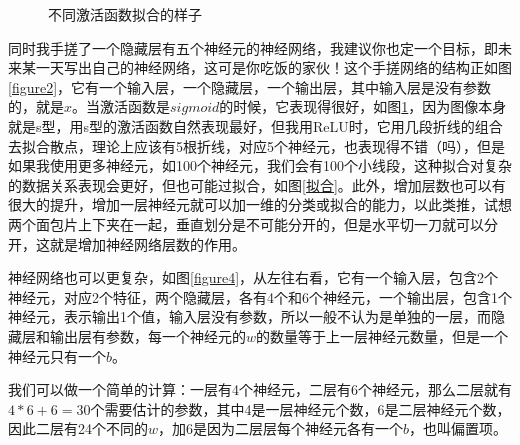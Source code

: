 \documentclass[a5paper, 11pt]{ctexbook}
\begin{document}
\begin{figure}[ht]
    \centering
    \caption{不同激活函数拟合的样子}
    \label{figure3}
\end{figure}

同时我手搓了一个隐藏层有五个神经元的神经网络，我建议你也定一个目标，即未来某一天写出自己的神经网络，这可是你吃饭的家伙！这个手搓网络的结构正如图\ref{figure2}，它有一个输入层，一个隐藏层，一个输出层，其中输入层是没有参数的，就是$x$。当激活函数是$sigmoid$的时候，它表现得很好，如图\ref{figure3}，因为图像本身就是s型，用s型的激活函数自然表现最好，但我用ReLU时，它用几段折线的组合去拟合散点，理论上应该有5根折线，对应5个神经元，也表现得不错（吗），但是如果我使用更多神经元，如100个神经元，我们会有100个小线段，这种拟合对复杂的数据关系表现会更好，但也可能过拟合，如图\ref{拟合}。此外，增加层数也可以有很大的提升，增加一层神经元就可以加一维的分类或拟合的能力，以此类推，试想两个面包片上下夹在一起，垂直划分是不可能分开的，但是水平切一刀就可以分开，这就是增加神经网络层数的作用。

神经网络也可以更复杂，如图\ref{figure4}，从左往右看，它有一个输入层，包含2个神经元，对应2个特征，两个隐藏层，各有4个和6个神经元，一个输出层，包含1个神经元，表示输出1个值，输入层没有参数，所以一般不认为是单独的一层，而隐藏层和输出层有参数，每一个神经元的$w$的数量等于上一层神经元数量，但是一个神经元只有一个$b$。

我们可以做一个简单的计算：一层有4个神经元，二层有6个神经元，那么二层就有$4*6+6=30$个需要估计的参数，其中4是一层神经元个数，6是二层神经元个数，因此二层有24个不同的$w$，加6是因为二层层每个神经元各有一个$b$，也叫偏置项。
\end{document}
